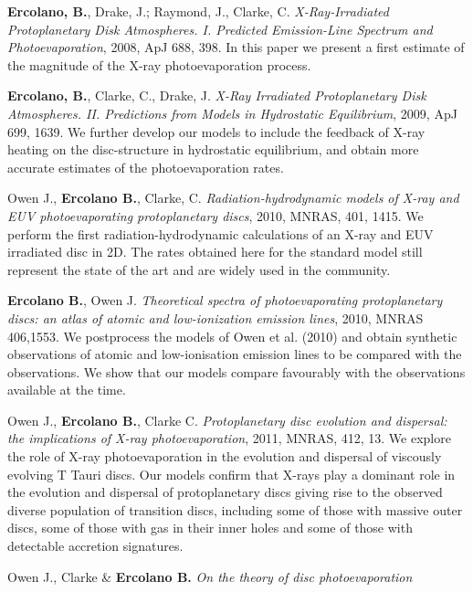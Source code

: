 \documentclass[10pt,fleqn,twoside]{article}
\newenvironment{literature}%
 {\begin{multicols}{2}\begin{scriptsize}\begin{list}{}{%
   \setlength{\topsep}{0em}%
   \setlength{\parskip}{0em}%
   \setlength{\parsep}{0em}%
   \setlength{\itemsep}{0em}%
   \setlength{\rightmargin}{0em}%
   \setlength{\leftmargin}{2em}%
   \setlength{\itemindent}{-2em}}}%
 {\end{list}\end{scriptsize}\end{multicols}}
\begin{document}
\begin{literature}

\item \textbf{Ercolano, B.},  Drake, J.; Raymond, J., Clarke, C.
  \textit{X-Ray-Irradiated Protoplanetary Disk Atmospheres. I. Predicted Emission-Line Spectrum and Photoevaporation}, 2008, ApJ
  688, 398. In this paper we present a first estimate of the magnitude
  of the X-ray photoevaporation process. 
\item \textbf{Ercolano, B.}, Clarke, C., Drake, J. \textit{X-Ray
    Irradiated Protoplanetary Disk Atmospheres. II. Predictions from
    Models in Hydrostatic Equilibrium}, 2009, ApJ 699, 1639. We
  further develop our models to include the feedback of X-ray heating
  on the disc-structure in hydrostatic equilibrium, and obtain more
  accurate estimates of the photoevaporation rates. 
\item Owen J., \textbf{Ercolano B.}, Clarke,
  C. \textit{Radiation-hydrodynamic models of X-ray and EUV
    photoevaporating protoplanetary discs}, 2010, MNRAS, 
  401, 1415. We perform the first radiation-hydrodynamic calculations
  of an X-ray and EUV irradiated disc in 2D. The rates obtained here
  for the standard model still represent the state of the art and are
  widely used in the community. 
\item \textbf{Ercolano B.}, Owen J. {\em Theoretical spectra of
    photoevaporating protoplanetary discs: an atlas of atomic and
    low-ionization emission lines}, 2010, MNRAS 406,1553. We postprocess the
  models of Owen et al. (2010) and obtain synthetic observations of
  atomic and low-ionisation emission lines to be compared with the
  observations. We show that our models compare favourably with the
  observations available at the time.
\item Owen J., \textbf{Ercolano B.}, Clarke C.  \textit{
  Protoplanetary disc evolution and dispersal: the implications of X-ray photoevaporation}, 2011, MNRAS, 412, 13.
  We explore the role of X-ray photoevaporation in the evolution and
  dispersal of viscously evolving T Tauri discs. Our models confirm
  that X-rays play a dominant role in the evolution and dispersal of
  protoplanetary discs giving rise to the observed diverse population
  of transition discs, including some of those with massive outer
  discs, some of those
  with gas in their inner holes and some of those with detectable accretion
  signatures.  
\item Owen J., Clarke \& \textbf{Ercolano B.}  \textit{On the theory of disc photoevaporation}

\end{literature}
\end{document}
